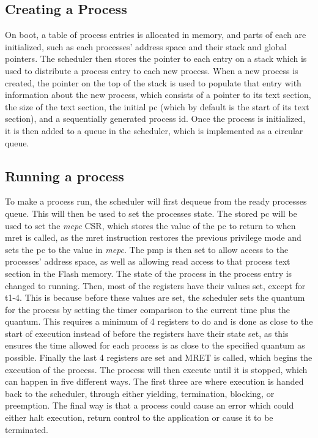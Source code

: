 \subsection{Creating a Process}
On boot, a table of process entries is allocated in memory, and parts of each are initialized, such as each processes' address space and their stack and global pointers. The scheduler then stores the pointer to each entry on a stack which is used to distribute a process entry to each new process. When a new process is created, the pointer on the top of the stack is used to populate that entry with information about the new process, which consists of a pointer to its text section, the size of the text section, the initial pc (which by default is the start of its text section), and a sequentially generated process id. Once the process is initialized, it is then added to a queue in the scheduler, which is implemented as a circular queue.
\subsection{Running a process}
To make a process run, the scheduler will first dequeue from the ready processes queue. This will then be used to set the processes state. The stored pc will be used to set the \textit{mepc} CSR, which stores the value of the pc to return to when mret is called, as the mret instruction restores the previous privilege mode and sets the pc to the value in \textit{mepc}. The \ac{pmp} is then set to allow access to the processes' address space, as well as allowing read access to that process text section in the Flash memory. The state of the process in the process entry is changed to running. Then, most of the registers have their values set, except for t1-4. This is because before these values are set, the scheduler sets the quantum for the process by setting the timer comparison to the current time plus the quantum. This requires a minimum of 4 registers to do and is done as close to the start of execution instead of before the registers have their state set, as this ensures the time allowed for each process is as close to the specified quantum as possible. Finally the last 4 registers are set and MRET is called, which begins the execution of the process. The process will then execute until it is stopped, which can happen in five different ways. The first three are where execution is handed back to the scheduler, through either yielding, termination, blocking, or preemption. The final way is that a process could cause an error which could either halt execution, return control to the application or cause it to be terminated.
